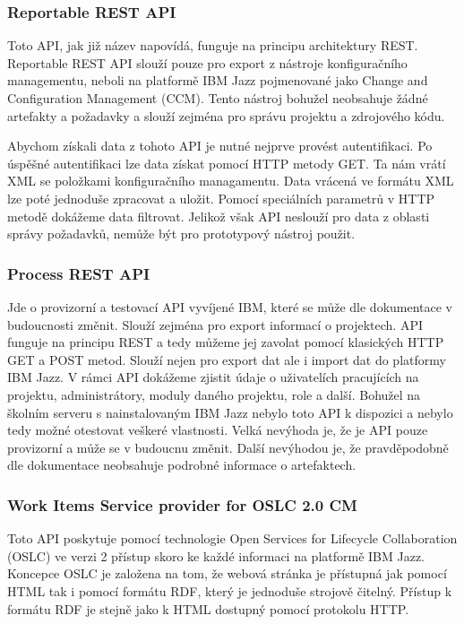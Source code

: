 \documentclass[czech,master,public,dept460,male,cpdeclaration,oneside]{diploma}
\begin{document}
\subsubsection{Reportable REST API}
Toto API, jak již název napovídá, funguje na principu architektury REST. Reportable REST API slouží pouze pro export z nástroje konfiguračního managementu, neboli na platformě IBM Jazz pojmenované jako Change and Configuration Management (CCM). Tento nástroj bohužel neobsahuje žádné artefakty a požadavky a slouží zejména pro správu projektu a zdrojového kódu.

Abychom získali data z tohoto API je nutné nejprve provést autentifikaci. Po úspěšné autentifikaci lze data získat pomocí HTTP metody GET. Ta nám vrátí XML se položkami konfiguračního managamentu. Data vrácená ve formátu XML lze poté jednoduše zpracovat a uložit. Pomocí speciálních parametrů v HTTP metodě dokážeme data filtrovat. Jelikož však API neslouží pro data z oblasti správy požadavků, nemůže být pro prototypový nástroj použit.

\subsubsection{Process REST API}
Jde o provizorní a testovací API vyvíjené IBM, které se může dle dokumentace v budoucnosti změnit. Slouží zejména pro export informací o projektech. API funguje na principu REST a tedy můžeme jej zavolat pomocí klasických HTTP GET a POST metod. Slouží nejen pro export dat ale i import dat do platformy IBM Jazz. V rámci API dokážeme zjistit údaje o uživatelích pracujících na projektu, administrátory, moduly daného projektu, role a další. Bohužel na školním serveru s nainstalovaným IBM Jazz nebylo toto API k dispozici a nebylo tedy možné otestovat veškeré vlastnosti. Velká nevýhoda je, že je API pouze provizorní a může se v budoucnu změnit. Další nevýhodou je, že pravděpodobně dle dokumentace neobsahuje podrobné informace o artefaktech.

\subsubsection{Work Items Service provider for OSLC 2.0 CM}
Toto API poskytuje pomocí technologie Open Services for Lifecycle Collaboration (OSLC) ve verzi 2 přístup skoro ke každé informaci na platformě IBM Jazz. Koncepce OSLC je založena na tom, že webová stránka je přístupná jak pomocí HTML tak i pomocí formátu RDF, který je jednoduše strojově čitelný. Přístup k formátu RDF je stejně jako k HTML dostupný pomocí protokolu HTTP.
\end{document}
